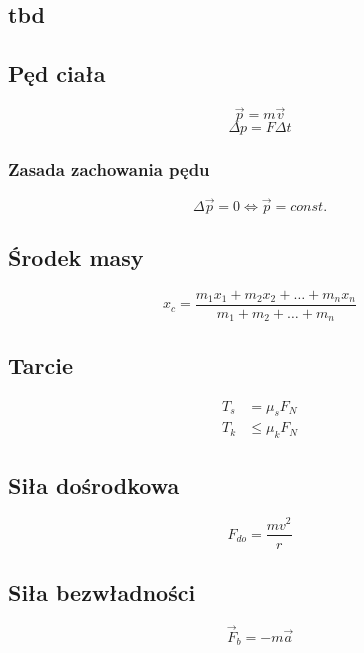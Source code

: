 \documentclass{article}
\newcommand{\F}{\vec{F}}
\begin{document}
    \subsection{tbd}
    \subsection{Pęd ciała}
      \begin{equation*}
        \vec{p} = m\vec{v}
      \end{equation*}
      \begin{equation*}
        \Delta p = F\Delta t
      \end{equation*}
      \subsubsection{Zasada zachowania pędu}
        \begin{equation*}
          \Delta \vec{p} = 0 \Leftrightarrow \vec{p} = const.
        \end{equation*}
      \subsection{Środek masy}
        \begin{equation*}
          x_c = \frac{m_1x_1+m_2x_2+\dots+m_nx_n}{m_1+m_2+\dots+m_n}
        \end{equation*}
      \subsection{Tarcie}
        \begin{align*}
          T_s &= \mu_sF_N\\
          T_k &\leqslant \mu_kF_N
        \end{align*}
      \subsection{Siła dośrodkowa}
        \begin{equation*}
          F_{do} = \frac{mv^2}{r}
        \end{equation*}
        \subsection{Siła bezwładności}
        \begin{equation*}
          \F_b = -m\vec{a}
        \end{equation*}
  \newpage
\end{document}
